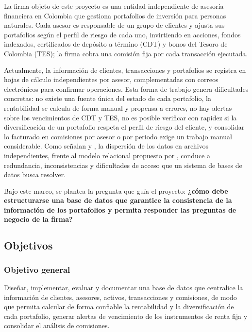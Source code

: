 \documentclass[10pt,letterpaper]{article}
\renewcommand{\_}{\oldUS\allowbreak}
\begin{document}
La firma objeto de este proyecto es una entidad independiente de asesoría financiera en Colombia que gestiona portafolios de inversión para personas naturales. Cada asesor es responsable de un grupo de clientes y ajusta sus portafolios según el perfil de riesgo de cada uno, invirtiendo en acciones, fondos indexados, certificados de depósito a término (CDT) y bonos del Tesoro de Colombia (TES); la firma cobra una comisión fija por cada transacción ejecutada.

Actualmente, la información de clientes, transacciones y portafolios se registra en hojas de cálculo independientes por asesor, complementadas con correos electrónicos para confirmar operaciones. Esta forma de trabajo genera dificultades concretas: no existe una fuente única del estado de cada portafolio, la rentabilidad se calcula de forma manual y propensa a errores, no hay alertas sobre los vencimientos de CDT y TES, no es posible verificar con rapidez si la diversificación de un portafolio respeta el perfil de riesgo del cliente, y consolidar lo facturado en comisiones por asesor o por periodo exige un trabajo manual considerable. Como señalan \citet{elmasri2016} y \citet{silberschatz2019}, la dispersión de los datos en archivos independientes, frente al modelo relacional propuesto por \citet{codd1970}, conduce a redundancia, inconsistencias y dificultades de acceso que un sistema de bases de datos busca resolver.

Bajo este marco, se plantea la pregunta que guía el proyecto: \textbf{¿cómo debe estructurarse una base de datos que garantice la consistencia de la información de los portafolios y permita responder las preguntas de negocio de la firma?}

\subsection{Objetivos}

\subsubsection{Objetivo general}

Diseñar, implementar, evaluar y documentar una base de datos que centralice la información de clientes, asesores, activos, transacciones y comisiones, de modo que permita calcular de forma confiable la rentabilidad y la diversificación de cada portafolio, generar alertas de vencimiento de los instrumentos de renta fija y consolidar el análisis de comisiones.
\end{document}
